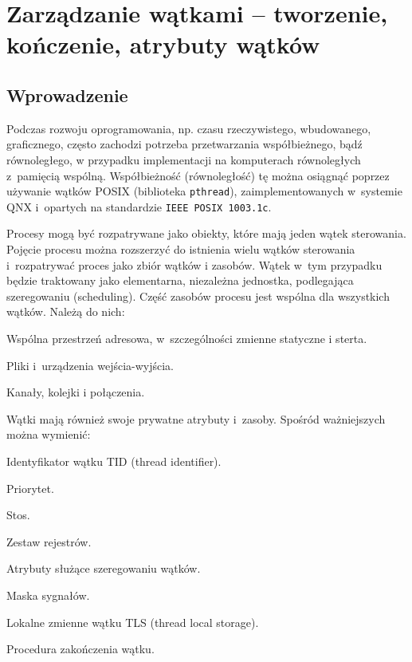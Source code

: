 \section{Zarządzanie wątkami – tworzenie, kończenie, atrybuty wątków}

\subsection{Wprowadzenie}

Podczas rozwoju oprogramowania, np. czasu rzeczywistego, wbudowanego, graficznego, często zachodzi potrzeba przetwarzania współbieżnego, bądź równoległego, w przypadku implementacji na komputerach równoległych z~pamięcią wspólną. Współbieżność (równoległość) tę można osiągnąć poprzez używanie wątków POSIX (biblioteka \lstinline[style=MyBashStyle]{pthread}), zaimplementowanych w~systemie QNX i~opartych na standardzie \lstinline[style=MyBashStyle]{IEEE POSIX 1003.1c}.  

Procesy mogą być rozpatrywane jako obiekty, które mają jeden wątek sterowania. Pojęcie procesu można rozszerzyć do istnienia wielu wątków sterowania i~rozpatrywać proces jako zbiór wątków i zasobów. Wątek w~tym przypadku będzie traktowany jako elementarna, niezależna jednostka, podlegająca szeregowaniu (scheduling). Część zasobów procesu jest wspólna dla wszystkich wątków. Należą do nich:

\begin{myitemize}
\item Wspólna przestrzeń adresowa, w~szczególności zmienne statyczne i sterta.
\item Pliki i~urządzenia wejścia-wyjścia.
\item Kanały, kolejki i połączenia. 
\end{myitemize}

Wątki mają również swoje prywatne atrybuty i~zasoby. Spośród ważniejszych można wymienić:

\begin{myitemize}
\item Identyfikator wątku TID (thread identifier). 
\item Priorytet.
\item Stos.
\item Zestaw rejestrów.
\item Atrybuty służące szeregowaniu wątków.
\item Maska sygnałów.
\item Lokalne zmienne wątku TLS (thread local storage). 
\item Procedura zakończenia wątku. 
\end{myitemize}

